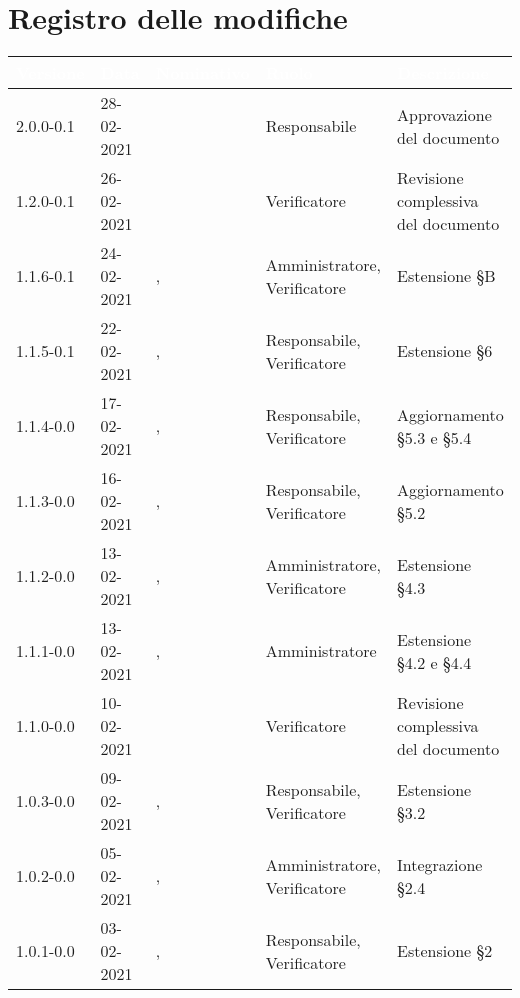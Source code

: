 \section*{Registro delle modifiche}
{
\setcounter{table}{-1}
{
\renewcommand{\arraystretch}{1.5}
\centering
\begin{longtable}{C{1.7cm} C{2.5cm} C{3.2cm} C{2.7cm} C{4.8cm}}
\textcolor{white}{\textbf{Versione}}&
\textcolor{white}{\textbf{Data}}&
\textcolor{white}{\textbf{Nominativo}}&
\textcolor{white}{\textbf{Ruolo}}&
\textcolor{white}{\textbf{Descrizione}}\\	
\endhead

2.0.0-0.1 & 28-02-2021 & \PA{} & Responsabile & Approvazione del documento\\

1.2.0-0.1 & 26-02-2021 & \SP{} & Verificatore & Revisione complessiva del documento\\

1.1.6-0.1 & 24-02-2021 & \SG{}, \SP{} & Amministratore, Verificatore & Estensione \S B\\

1.1.5-0.1 & 22-02-2021 & \PA{}, \SP{} & Responsabile, Verificatore & Estensione \S 6\\

1.1.4-0.0 & 17-02-2021 & \PA{}, \ZM{} & Responsabile, Verificatore & Aggiornamento \S 5.3 e \S 5.4\\

1.1.3-0.0 & 16-02-2021 & \PA{}, \ZM{} & Responsabile, Verificatore & Aggiornamento \S 5.2\\

1.1.2-0.0 & 13-02-2021 & \BM{}, \ZM{} & Amministratore, Verificatore & Estensione \S 4.3\\

1.1.1-0.0 & 13-02-2021 & \SG{}, \ZM{} & Amministratore & Estensione \S 4.2 e \S 4.4\\

1.1.0-0.0 & 10-02-2021 & \ZM{} & Verificatore & Revisione complessiva del documento\\

1.0.3-0.0 & 09-02-2021 & \PA{}, \SP{} & Responsabile, Verificatore & Estensione \S 3.2\\

1.0.2-0.0 & 05-02-2021& \BM{}, \SP{} & Amministratore, Verificatore & Integrazione \S 2.4\\

1.0.1-0.0 & 03-02-2021 & \PA{}, \SP{} & Responsabile, Verificatore & Estensione \S 2\\


\end{longtable}}}
